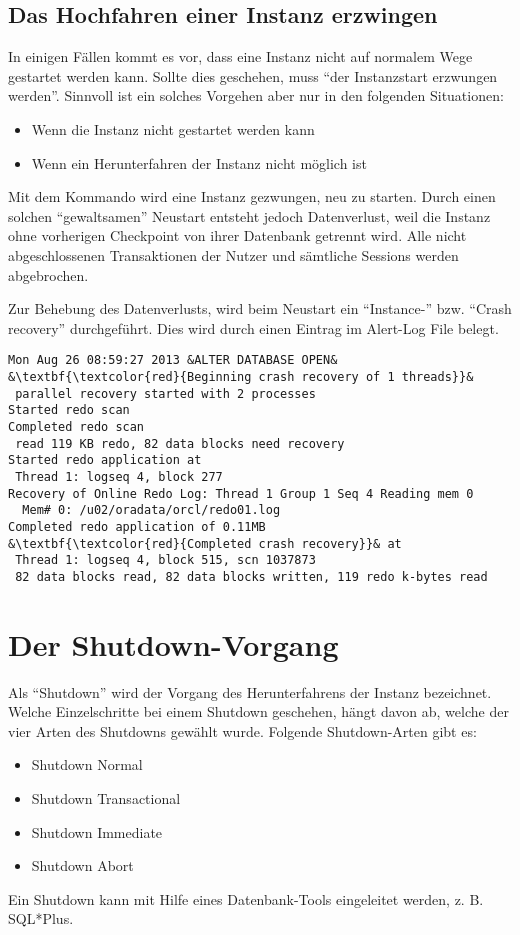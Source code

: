       \subsection{Das Hochfahren einer Instanz erzwingen}
        In einigen Fällen kommt es vor, dass eine Instanz nicht auf normalem Wege gestartet werden kann. Sollte dies geschehen, muss \enquote{der Instanzstart erzwungen werden}. Sinnvoll ist ein solches Vorgehen aber nur in den folgenden Situationen:
        \begin{itemize}
          \item Wenn die Instanz nicht gestartet werden kann
          \item Wenn ein Herunterfahren der Instanz nicht möglich ist
        \end{itemize}
        Mit dem Kommando  wird eine Instanz gezwungen, neu zu starten. Durch einen solchen \enquote{gewaltsamen} Neustart entsteht jedoch Datenverlust, weil die Instanz ohne vorherigen Checkpoint von ihrer Datenbank getrennt wird. Alle nicht abgeschlossenen Transaktionen der Nutzer und sämtliche Sessions werden abgebrochen.

        Zur Behebung des Datenverlusts, wird beim Neustart ein
        \enquote{Instance-} bzw. \enquote{Crash recovery} durchgeführt. Dies
        wird durch einen Eintrag im Alert-Log File belegt.
        \begin{lstlisting}[caption={Ein erzwungener Neustart der Instanz und
        seine Folgen - Der Eintrag im Alert Log
        File},label=admin07,language=terminal]
Mon Aug 26 08:59:27 2013 &ALTER DATABASE OPEN& 
&\textbf{\textcolor{red}{Beginning crash recovery of 1 threads}}&
 parallel recovery started with 2 processes
Started redo scan
Completed redo scan
 read 119 KB redo, 82 data blocks need recovery
Started redo application at
 Thread 1: logseq 4, block 277
Recovery of Online Redo Log: Thread 1 Group 1 Seq 4 Reading mem 0
  Mem# 0: /u02/oradata/orcl/redo01.log
Completed redo application of 0.11MB
&\textbf{\textcolor{red}{Completed crash recovery}}& at
 Thread 1: logseq 4, block 515, scn 1037873
 82 data blocks read, 82 data blocks written, 119 redo k-bytes read
        \end{lstlisting}
    \section{Der Shutdown-Vorgang}
      Als \enquote{Shutdown} wird der Vorgang des Herunterfahrens der Instanz bezeichnet. Welche Einzelschritte bei einem Shutdown geschehen, hängt davon ab, welche der vier Arten des Shutdowns gewählt wurde. Folgende Shutdown-Arten gibt es:
      \begin{itemize}
        \item Shutdown Normal
        \item Shutdown Transactional
        \item Shutdown Immediate
        \item Shutdown Abort
      \end{itemize}
      Ein Shutdown kann mit Hilfe eines Datenbank-Tools eingeleitet werden, z. B. SQL*Plus.


